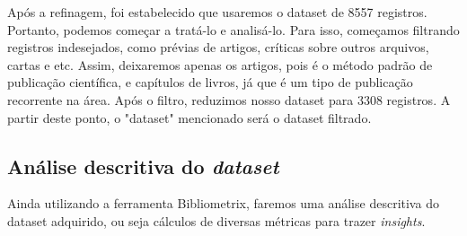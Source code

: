 Após a refinagem, foi estabelecido que usaremos o dataset de 8557 registros. Portanto, podemos começar a tratá-lo e analisá-lo. Para isso, começamos filtrando registros indesejados, como prévias de artigos, críticas sobre outros arquivos, cartas e etc. Assim, deixaremos apenas os artigos, pois é o método padrão de publicação científica, e capítulos de livros, já que é um tipo de publicação recorrente na área. Após o filtro, reduzimos nosso dataset para 3308 registros. A partir deste ponto, o "dataset" mencionado será o dataset filtrado.

\subsection{Análise descritiva do \textit{dataset}}

Ainda utilizando a ferramenta Bibliometrix, faremos uma análise descritiva do dataset adquirido, ou seja cálculos de diversas métricas para trazer \textit{insights}.

